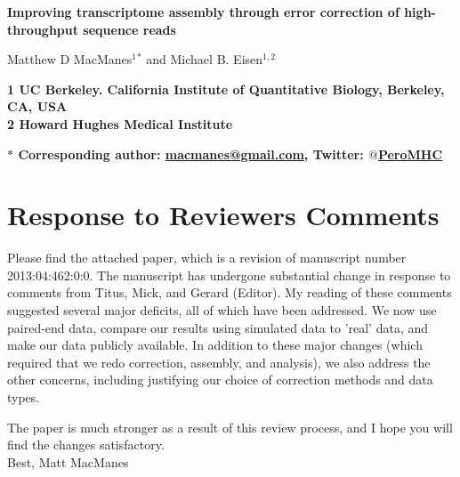 \documentclass[11pt]{article}
\begin{document}
\begin{flushleft}


{\Large
\textbf{Improving transcriptome assembly through error correction of high-throughput sequence reads}
}
\\ 
\vspace{4mm}

\noindent
Matthew D MacManes$^{1}$$^\ast$ and
Michael B. Eisen$^{1,2}$ \\
\vspace{5mm}

\bf{1} \textnormal{UC Berkeley. California Institute of Quantitative Biology, Berkeley, CA, USA} \\
\bf{2} \textnormal{Howard Hughes Medical Institute} \\
\vspace{2mm}
 
\bf{$\ast$} \textnormal{Corresponding author: \href{mailto:macmanes@gmail.com}{macmanes@gmail.com}, Twitter: \href{https://twitter.com/PeroMHC}{$@$PeroMHC}}
\end{flushleft}
\vspace{4mm}



\section*{Response to Reviewers Comments}

\hspace{5mm} Please find the attached paper, which is a revision of manuscript number 2013:04:462:0:0. The manuscript has undergone substantial change in response to comments from Titus, Mick, and Gerard (Editor).  My reading of these comments suggested several major deficits, all of which have been addressed. We now use paired-end data, compare our results using simulated data to 'real' data, and make our data publicly available. In addition to these major changes (which required that we redo correction, assembly, and analysis), we also address the other concerns, including justifying our choice of correction methods and data types. 

The paper is much stronger as a result of this review process, and I hope you will find the changes satisfactory. \\

\noindent
Best, Matt MacManes 
\end{document}
